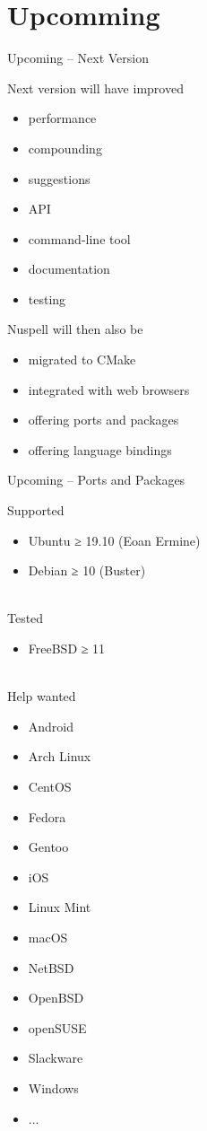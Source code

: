 \documentclass{beamer}
\begin{document}
\section{Upcomming}

\begin{frame}{Upcoming – Next Version}
\begin{multicols}{2}
Next version will have improved
\begin{itemize}
\item \alert{performance}
\item compounding
\item suggestions
\item API
\item command-line tool
\item documentation
\item testing
\end{itemize}
Nuspell will then also be
\begin{itemize}
\item migrated to CMake
\item integrated with web browsers
\item offering ports and packages
\item offering language bindings
\end{itemize}
\end{multicols}
\end{frame}

\begin{frame}{Upcoming – Ports and Packages}
\begin{multicols}{2}
Supported
\begin{itemize}
\item Ubuntu ≥ 19.10 (Eoan Ermine)
\item Debian ≥ 10 (Buster)
\end{itemize}
\mbox{}\\
Tested
\begin{itemize}
\item FreeBSD ≥ 11
\end{itemize}
\mbox{}\\
Help wanted
\begin{itemize}
\item Android
\item Arch Linux
\item CentOS
\item Fedora
\item Gentoo
\item iOS
\item Linux Mint
\item macOS
\item NetBSD
\item OpenBSD
\item openSUSE
\item Slackware
\item Windows
\item ...
\end{itemize}
\end{multicols}
\end{frame}
\end{document}
